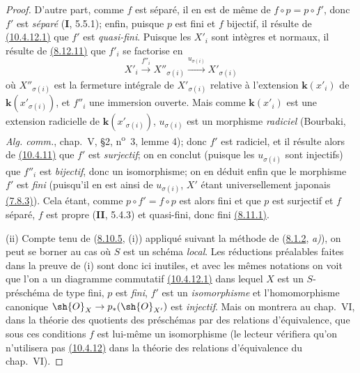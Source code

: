 \begin{proof}
D'autre part, comme $f$ est séparé, il en est de même de
$f\circ p=p\circ f'$, donc $f'$ est \emph{séparé} (\textbf{I}, 5.5.1); enfin, puisque
$p$ est fini et $f$ bijectif, il résulte de
{\hyperlink{ega4.c04.sec.10-4-12-1}{(10.4.12.1)}} que $f'$ est
\emph{quasi-fini}. Puisque les $X'_i$ sont intègres et normaux, il résulte de
{\hyperref[canon-index.ega4.c04.cor.8-12-11]{(8.12.11)}} que $f'_i$ se factorise en
\[
 X'_i\xrightarrow{f''_i}X''_{\sigma(i)}
 \xrightarrow{u_{\sigma(i)}}X'_{\sigma(i)}
\]
où $X''_{\sigma(i)}$ est la fermeture intégrale de
$X'_{\sigma(i)}$ relative à l'extension $\boldsymbol{k}(x'_i)$ de
$\boldsymbol{k}(x'_{\sigma(i)})$, et $f''_i$ une immersion ouverte. Mais comme
$\boldsymbol{k}(x'_i)$ est une extension radicielle de $\boldsymbol{k}(x'_{\sigma(i)})$,
$u_{\sigma(i)}$ est un morphisme \emph{radiciel} (Bourbaki,
\emph{Alg. comm.}, chap.~V, \S2, n\textsuperscript{o}~3, lemme 4);
donc $f'$ est radiciel, et il résulte alors de
{\hyperref[canon-index.ega4.c04.statement.10-4-11]{(10.4.11)}} que $f'$ est
\emph{surjectif}; on en conclut (puisque les $u_{\sigma(i)}$ sont injectifs)
que $f''_i$ est \emph{bijectif}, donc un isomorphisme; on en déduit enfin que
le morphisme $f'$ est \emph{fini} (puisqu'il en est ainsi de $u_{\sigma(i)}$,
$X'$ étant universellement japonais
{\hyperref[canon-index.ega4.c04.statement.7-8-3]{(7.8.3)}}). Cela étant, comme
$p\circ f'=f\circ p$ est alors fini et que $p$ est surjectif et $f$
séparé, $f$ est propre (\textbf{II}, 5.4.3) et quasi-fini, donc fini
{\hyperref[canon-index.ega4.c04.thm.8-11-1]{(8.11.1)}}.

\textup{(ii)} Compte tenu de
({\hyperref[canon-index.ega4.c04.thm.8-10-5]{8.10.5}}, (i)) appliqué suivant la
méthode de ({\hyperref[canon-index.ega4.c04.statement.8-1-2]{8.1.2}}, \emph{a)}), on peut
se borner au cas où $S$ est un schéma \emph{local}. Les réductions préalables
faites dans la preuve de (i) sont donc ici inutiles, et avec les mêmes
notations on voit que l'on a un diagramme commutatif
{\hyperlink{ega4.c04.sec.10-4-12-1}{(10.4.12.1)}} dans lequel $X$ est
un $S$-préschéma de type fini, $p$ est \emph{fini}, $f'$ est un \emph{isomorphisme} et
l'homomorphisme canonique $\sh{O}_X\to p_*(\sh{O}_{X'})$ est \emph{injectif}.
Mais on montrera au chap.~VI, dans la théorie des quotients des
préschémas par des relations d'équivalence, que sous ces conditions $f$
est lui-même un isomorphisme (le lecteur vérifiera qu'on n'utilisera pas
{\hyperlink{ega4.c04.cor.10-4-12}{(10.4.12)}} dans la théorie des
relations d'équivalence du chap.~VI).
\end{proof}

